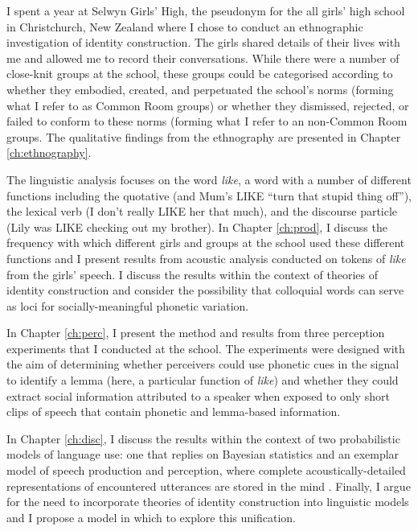I spent a year at Selwyn Girls' High, the pseudonym for the all girls' high school in Christchurch, New Zealand where I chose to conduct an ethnographic investigation of identity construction.  The girls shared details of their lives with me and allowed me to record their conversations.  While there were a number of close-knit groups at the school, these groups could be categorised according to whether they embodied, created, and perpetuated the school's norms (forming what I refer to as Common Room groups) or whether they dismissed, rejected, or failed to conform to these norms (forming what I refer to an non-Common Room groups.  The qualitative findings from the ethnography are presented in Chapter \ref{ch:ethnography}.

The linguistic analysis focuses on the word \textit{like}, a word with a number of different functions including the quotative (and Mum's LIKE ``turn that stupid thing off''), the lexical verb (I don't really LIKE her that much), and the discourse particle (Lily was LIKE checking out my brother).  In Chapter \ref{ch:prod}, I discuss the frequency with which different girls and groups at the school used these different functions and I present results from acoustic analysis conducted on tokens of \textit{like} from the girls' speech.  I discuss the results within the context of theories of identity construction and consider the possibility that colloquial words can serve as loci for socially-meaningful phonetic variation.


In Chapter \ref{ch:perc}, I present the method and results from three perception experiments that I conducted at the school.  The experiments were designed with the aim of determining whether perceivers could use phonetic cues in the signal to identify a lemma (here, a particular function of \textit{like}) and whether they could extract social information attributed to a speaker when exposed to only short clips of speech that contain phonetic and lemma-based information.

In Chapter \ref{ch:disc}, I discuss the results within the context of two probabilistic models of language use: one that replies on Bayesian statistics \cite{jurafsky1996,narayananjurafsky2002} and an exemplar model of speech production and perception, where complete acoustically-detailed representations of encountered utterances are stored in the mind \cite{johnson1997,pierrehumbert2001}.  Finally, I argue for the need to incorporate theories of identity construction into linguistic models and I propose a model in which to explore this unification. 


